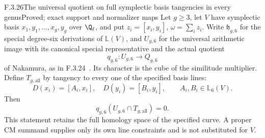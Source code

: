 \begin{result}{F.3.26}{The universal quotient on full symplectic basis tangencies in every genus}{Proved; exact support and normalizer maps}
Let $g\geq3$, let $V$ have symplectic basis
$x_1,y_1,\ldots,x_g,y_g$ over $\Q_\ell$, and put
$z_i=[x_i,y_i]$, $\omega=\sum_i z_i$.
Write $\mathfrak h_{g,6}$ for the special degree-six
derivations of $\mathbb L(V)$, and $U_{g,6}$ for the
universal arithmetic image with its canonical special
representative and the actual quotient
\[
                 q_{g,6}:U_{g,6}\longrightarrow Q_{g,6}
\]
of Nakamura, as in F.3.24~\cite[pp.~115--117]{AuditNakamura1996}. Its character is the cube
of the similitude multiplier. Define $T_{g,\mathrm{all}}$
by tangency to every one of the specified basis lines:
\[
 D(x_i)=[A_i,x_i],\quad D(y_i)=[B_i,y_i],
 \qquad A_i,B_i\in\mathbb L_6(V).
\]
Then
\[
                 q_{g,6}(U_{g,6}\cap T_{g,\mathrm{all}})=0.
                                                               \tag{AG.1}
\]
This statement retains the full homology space of the
specified curve. A proper CM summand supplies only its
own line constraints and is not substituted for $V$.

\end{result}
